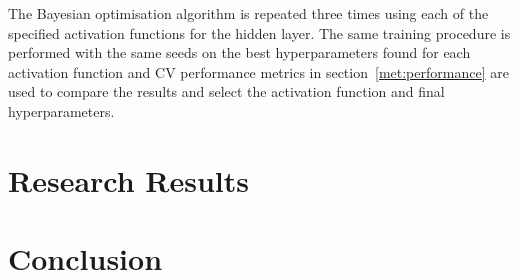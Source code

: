 \documentclass[conference]{IEEEtran}
\begin{document}
	The Bayesian optimisation algorithm is repeated three times using each of the specified activation functions for the hidden layer. The same training procedure is performed with the same seeds on the best hyperparameters found for each activation function and CV performance metrics in section~\ref{met:performance} are used to compare the results and select the activation function and final hyperparameters.
	
	\section{Research Results}

	
	\section{Conclusion}
	
	
	
	
	
	\appendix
	
	
	
	
	
	
	
	
	
%	
%	
%	
	
	
	
	
	
%	
	
%	
%	
%	
	
	
	
%	
%	
%	
	
	
	
%	
%	
	
	
	
	
%	
%	
	
%	
	
	
%	
%	
	
%	
	
	
%	
%	
	
	
	
\end{document}

